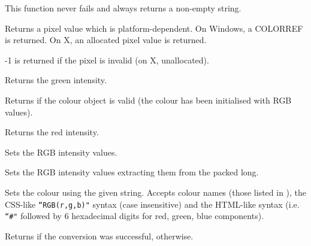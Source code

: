 This function never fails and always returns a non-empty string.


\label{wxcolourgetpixel}


Returns a pixel value which is platform-dependent. On Windows, a COLORREF is returned.
On X, an allocated pixel value is returned.

-1 is returned if the pixel is invalid (on X, unallocated).


\label{wxcolourgreen}


Returns the green intensity.


\label{wxcolourok}


Returns \true if the colour object is valid (the colour has been initialised with RGB values).


\label{wxcolourred}


Returns the red intensity.


\label{wxcolourset}


Sets the RGB intensity values.


\label{wxcolourset2}


Sets the RGB intensity values extracting them from the packed long.


\label{wxcolourset3}


Sets the colour using the given string.
Accepts colour names (those listed in ), the CSS-like \texttt{``RGB(r,g,b)"} syntax (case insensitive) and the HTML-like syntax (i.e. \texttt{``\#"} followed by 6 hexadecimal digits for red, green, blue components).

Returns \true if the conversion was successful, \false otherwise.


\label{wxcolourassign}

